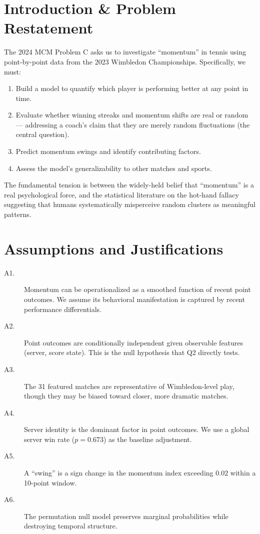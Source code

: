 \documentclass[11pt,a4paper]{article}
\begin{document}
\section{Introduction \& Problem Restatement}
The 2024 MCM Problem C asks us to investigate ``momentum'' in tennis using point-by-point data from the 2023 Wimbledon Championships. Specifically, we must:
\begin{enumerate}[label=(Q\arabic*)]
  \item Build a model to quantify which player is performing better at any point in time.
  \item Evaluate whether winning streaks and momentum shifts are real or random --- addressing a coach's claim that they are merely random fluctuations (the central question).
  \item Predict momentum swings and identify contributing factors.
  \item Assess the model's generalizability to other matches and sports.
\end{enumerate}
The fundamental tension is between the widely-held belief that ``momentum'' is a real psychological force, and the statistical literature on the hot-hand fallacy suggesting that humans systematically misperceive random clusters as meaningful patterns.

\section{Assumptions and Justifications}
\begin{description}
  \item[A1.] Momentum can be operationalized as a smoothed function of recent point outcomes. We assume its behavioral manifestation is captured by recent performance differentials.
  \item[A2.] Point outcomes are conditionally independent given observable features (server, score state). This is the null hypothesis that Q2 directly tests.
  \item[A3.] The 31 featured matches are representative of Wimbledon-level play, though they may be biased toward closer, more dramatic matches.
  \item[A4.] Server identity is the dominant factor in point outcomes. We use a global server win rate ($p = 0.673$) as the baseline adjustment.
  \item[A5.] A ``swing'' is a sign change in the momentum index exceeding $0.02$ within a 10-point window.
  \item[A6.] The permutation null model preserves marginal probabilities while destroying temporal structure.
\end{description}
\end{document}

